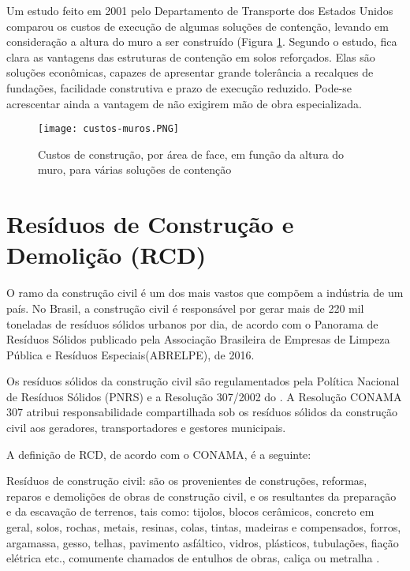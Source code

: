 Um estudo feito em 2001 pelo Departamento de Transporte dos Estados Unidos comparou os custos de execução de algumas soluções de contenção, levando em consideração a altura do muro a ser construído (Figura \ref{fig:custos-muros}. Segundo o estudo, fica clara as vantagens das estruturas de contenção em solos reforçados. Elas são soluções econômicas, capazes de apresentar grande tolerância a recalques de fundações, facilidade construtiva e prazo de execução reduzido. Pode-se acrescentar ainda a vantagem de não exigirem mão de obra especializada.

\begin{figure}[htb]
 \caption{Custos de construção, por área de face, em função da altura do muro, para várias soluções de contenção}
 \label{fig:custos-muros}
 \centering
 \texttt{[image: custos-muros.PNG]}
\end{figure}

\section{Resíduos de Construção e Demolição (RCD)}

O ramo da construção civil é um dos mais vastos que compõem a indústria de um país. No Brasil, a construção civil é responsável por gerar mais de 220 mil toneladas de resíduos sólidos urbanos por dia, de acordo com o Panorama de Resíduos Sólidos publicado pela Associação Brasileira de Empresas de Limpeza Pública e Resíduos Especiais(ABRELPE), de 2016. 

Os resíduos sólidos da construção civil são regulamentados pela Política Nacional de Resíduos Sólidos (PNRS) e a Resolução 307/2002 do . A Resolução CONAMA 307 atribui responsabilidade compartilhada sob os resíduos sólidos da construção civil aos geradores, transportadores e gestores municipais.

A definição de RCD, de acordo com o CONAMA, é a seguinte: 

\begin{citacao}
Resíduos de construção civil: são os provenientes de construções, reformas, reparos e demolições de obras de construção civil, e os resultantes da preparação e da escavação de terrenos, tais como: tijolos, blocos cerâmicos, concreto em geral, solos, rochas, metais, resinas, colas, tintas, madeiras e compensados, forros, argamassa, gesso, telhas, pavimento asfáltico, vidros, plásticos, tubulações, fiação elétrica etc., comumente chamados de entulhos de obras, caliça ou metralha \cite{conama:algpseudocode}.
\end{citacao}

